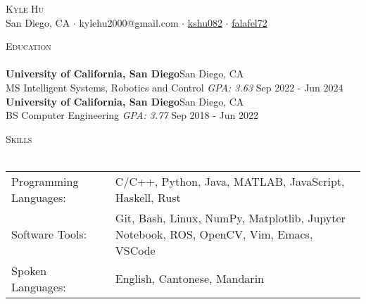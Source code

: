 \documentclass[a4paper]{article}
\newcommand{\lineunder} {
    \vspace*{-8pt} \\
    \hspace*{-18pt} \hrulefill \\
}
\newcommand{\header} [1] {
    {\hspace*{-18pt}\vspace*{6pt} \textsc{#1}}
    \vspace*{-6pt} \lineunder
}
\begin{document}

    

\begin{center}
	{\Huge \scshape {Kyle Hu}}\\
  \vspace{2mm}
	\faGlobe\:San Diego, CA
  $\cdot$ \faEnvelope\:kylehu2000@gmail.com
  $\cdot$ \faLinkedinSquare\:\href{https://www.linkedin.com/in/kshu082/}{kshu082}
  $\cdot$ \faGithubSquare\:\href{https://www.github.com/falafel72}{falafel72}
\end{center}

\begin{comment}
\header{Objective}
Looking for an entry-level full time job where I can fully utilize my
robotics education and systems experience.
\vspace{1mm}
\end{comment}
\header{Education}
\vspace{1mm}
\textbf{University of California, San Diego}\hfill San Diego, CA\\
MS Intelligent Systems, Robotics and Control \textit{GPA: 3.63} \hfill Sep 2022 - Jun 2024\\
\vspace{2mm}
\textbf{University of California, San Diego}\hfill San Diego, CA\\
BS Computer Engineering \textit{GPA: 3.77} \hfill Sep 2018 - Jun 2022\\
\vspace{2mm}

\header{Skills}
\vspace{1mm}
\begin{tabular}{ l l }
	Programming Languages: & C/C++, Python, Java, MATLAB, JavaScript, Haskell, Rust  \\
  Software Tools:       & Git, Bash, Linux, NumPy, Matplotlib, Jupyter Notebook, ROS, OpenCV, Vim, Emacs, VSCode \\
	Spoken Languages:      & English, Cantonese, Mandarin                     \\
\end{tabular}
\vspace{2mm}
\end{document}

